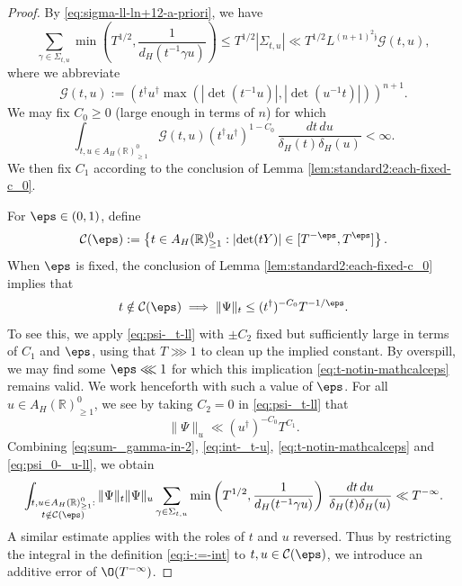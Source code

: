 \begin{proof}
  By \eqref{eq:sigma-ll-ln+12-a-priori}, we have
  \begin{equation}\label{eq:sum-_gamma-in-2}
    \sum_{\gamma \in \Sigma_{t,u}}
    \min \left( T^{1/2}, \frac{1}{d_H(t^{-1} \gamma u)} \right)
    \leq T^{1/2} |\Sigma_{t,u}| \ll
    T^{1/2}
    L^{(n+1)^2 \mathfrak{j}} \mathcal{G}(t,u),
  \end{equation}
  where we abbreviate
  \begin{equation*}
    \mathcal{G}(t,u)  := \left( t^\dagger u^\dagger \max(|\det(t^{-1} u)|, |\det(u^{-1} t)|) \right)^{n+1}.
  \end{equation*}
  We may fix $C_0 \geq 0$ (large enough in terms of $n$) for which
  \begin{equation}\label{eq:int-_t-u}
    \int_{t, u \in A_H(\mathbb{R})^0_{\geq 1}}
    \mathcal{G}(t,u) (t^\dagger u^\dagger )^{1- C_0} \, \frac{d t \, d u}{\delta_H(t) \delta_H(u)} < \infty.
  \end{equation}
  We then fix $C_1$ according to the conclusion of Lemma \ref{lem:standard2:each-fixed-c_0}.

  For $\eps \in (0,1)$, define
  \begin{equation*}
    \mathcal{C}(\eps) := \left\{ t \in A_H(\mathbb{R})^0_{\geq 1} : \left\lvert \det (t Y ) \right\rvert \in [T^{- \eps }, T^\eps ]\right\}.
  \end{equation*}
  When $\eps$ is fixed, the conclusion of Lemma \ref{lem:standard2:each-fixed-c_0} implies that
  \begin{equation}\label{eq:t-notin-mathcalceps}
    t \notin \mathcal{C}(\eps)
    \implies
    \|\Psi\|_t
    \leq
    (t^\dagger )^{-C_0} T^{-1/\eps}.
  \end{equation}
  To see this, we apply \eqref{eq:psi-_t-ll} with $\pm C_2$ fixed but sufficiently large in terms of $C_1$ and $\eps $, using that $T \ggg 1$ to clean up the implied constant.  By overspill, we may find some $\eps \lll 1$ for which this implication \eqref{eq:t-notin-mathcalceps} remains valid.  We work henceforth with such a value of $\eps$.  For all $u \in A_H(\mathbb{R})^0_{\geq 1}$, we see by taking $C_2 = 0$ in  \eqref{eq:psi-_t-ll} that
  \begin{equation}\label{eq:psi_0-_u-ll}
    \|\Psi\|_u \ll (u^\dagger )^{-C_0} T^{C_1}.
  \end{equation}
  Combining \eqref{eq:sum-_gamma-in-2}, \eqref{eq:int-_t-u}, \eqref{eq:t-notin-mathcalceps} and \eqref{eq:psi_0-_u-ll}, we obtain
  \begin{equation*}
    \int_{
      \substack{
        t, u \in A_H(\mathbb{R})^0_{\geq 1} :  \\
        t \notin \mathcal{C}(\eps)
      }
    }
    \|\Psi\|_t \|\Psi\|_u
    \sum_{\gamma \in \Sigma_{t,u}}
    \min \left( T^{1/2}, \frac{1}{d_H(t^{-1} \gamma u)} \right) \, \frac{d t \, d u}{\delta_H(t) \delta_H(u)}
    \ll T^{-\infty}.
  \end{equation*}
  A similar estimate applies with the roles of $t$ and $u$ reversed.  Thus by restricting the integral in the definition \eqref{eq:i-:=-int} to $t,u \in \mathcal{C}(\eps)$, we introduce an additive error of $\O(T^{-\infty})$.


\end{proof}
